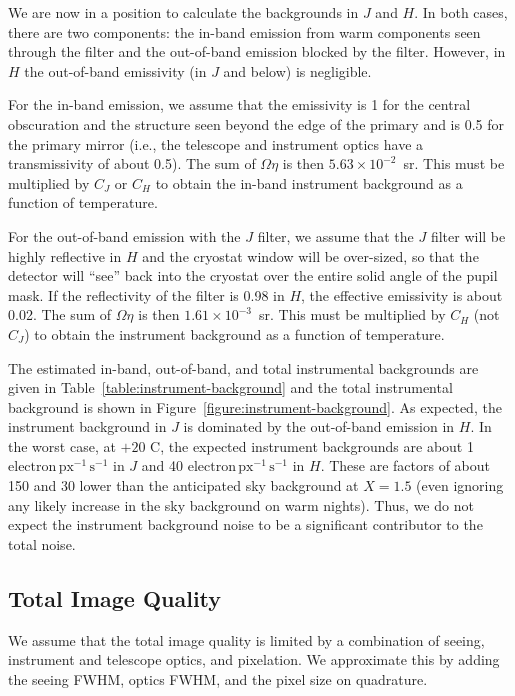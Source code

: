 \documentclass{article}
\begin{document}
We are now in a position to calculate the backgrounds in $J$ and $H$. In both cases, there are two components: the in-band emission from warm components seen through the filter and the out-of-band emission blocked by the filter. However, in $H$ the out-of-band emissivity (in $J$ and below) is negligible.

For the in-band emission, we assume that the emissivity is 1 for the central obscuration and the structure seen beyond the edge of the primary and is 0.5 for the primary mirror (i.e., the telescope and instrument optics have a transmissivity of about 0.5). The sum of $\Omega\eta$ is then $5.63 \times 10^{-2}$~sr. This must be multiplied by $C_J$ or $C_H$ to obtain the in-band instrument background as a function of temperature.

For the out-of-band emission with the $J$ filter, we assume that the $J$ filter will be highly reflective in $H$ and the cryostat window will be over-sized, so that the detector will “see” back into the cryostat over the entire solid angle of the pupil mask. If the reflectivity of the filter is 0.98 in $H$, the effective emissivity is about 0.02. The sum of $\Omega\eta$ is then $1.61 \times 10^{-3}$~sr. This must be multiplied by $C_H$ (not $C_J$) to obtain the instrument background as a function of temperature.

The estimated in-band, out-of-band, and total instrumental backgrounds are given in Table~\ref{table:instrument-background} and the total instrumental background is shown in Figure~\ref{figure:instrument-background}. As expected, the instrument background in $J$ is dominated by the out-of-band emission in $H$. In the worst case, at $+20$ C, the expected instrument backgrounds are about 1 $\mathrm{electron\,px^{-1}\,s^{-1}}$ in $J$ and 40 $\mathrm{electron\,px^{-1}\,s^{-1}}$ in $H$. These are factors of about 150 and 30 lower than the anticipated sky background at $X=1.5$ (even ignoring any likely increase in the sky background on warm nights). Thus, we do not expect the instrument background noise to be a significant contributor to the total noise.

\subsection{Total Image Quality}

We assume that the total image quality is limited by a combination of seeing, instrument and telescope optics, and pixelation. We approximate this by adding the seeing FWHM, optics FWHM, and the pixel size on quadrature. 
\end{document}

